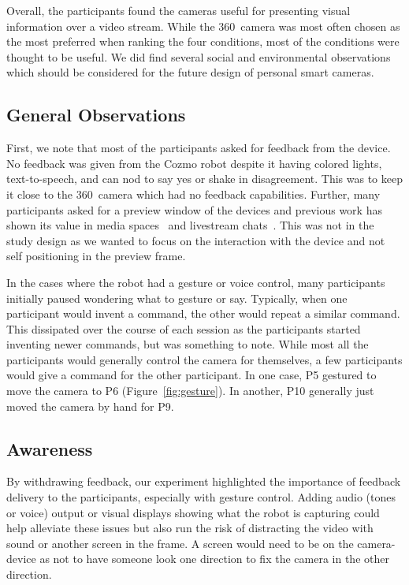 \documentclass{tufte-handout}
\begin{document}
Overall, the participants found the cameras useful for presenting
visual information over a video stream. While the 360\textdegree\
camera was most often chosen as the most preferred when ranking the
four conditions, most of the conditions were thought to be useful.  We
did find several social and environmental observations which should be
considered for the future design of personal smart cameras.

\subsection{General Observations}
First, we note that most of the participants asked for feedback from
the device.  No feedback was given from the Cozmo robot despite it
having colored lights, text-to-speech, and can nod to say yes or shake
in disagreement. This was to keep it close to the 360\textdegree\
camera which had no feedback capabilities.  Further, many participants
asked for a preview window of the devices and previous work has shown
its value in media spaces~\cite{Mok:2017:CPP:3064663.3064722} and
livestream chats~\cite{Shamma:2009:SOC:1556460.1556486}. This was not
in the study design as we wanted to focus on the interaction with the
device and not self positioning in the preview frame.

In the cases where the robot had a gesture or voice control, many
participants initially paused wondering what to gesture or say.
Typically, when one participant would invent a command, the other
would repeat a similar command.  This dissipated over the course of
each session as the participants started inventing newer commands, but
was something to note.  While most all the participants would
generally control the camera for themselves, a few participants would
give a command for the other participant.  In one case, P5 gestured to
move the camera to P6 (Figure~\ref{fig:gesture}).  In another, P10
generally just moved the camera by hand for P9.

\subsection{Awareness}
By withdrawing feedback, our experiment highlighted the importance of
feedback delivery to the participants, especially with gesture
control. Adding audio (tones or voice) output or visual displays
showing what the robot is capturing could help alleviate these issues
but also run the risk of distracting the video with sound or another
screen in the frame. A screen would need to be on the camera-device as
not to have someone look one direction to fix the camera in the other
direction.
\end{document}

